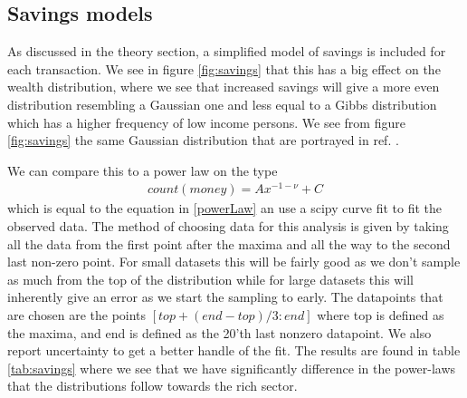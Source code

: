 \documentclass[a4paper,11pt]{article}
\begin{document}
{\subsection{Savings models}
As discussed in the theory section, a simplified model of savings is included for each transaction. We see in figure \ref{fig:savings} that this has a big effect on the wealth distribution, where we see that increased savings will give a more even distribution resembling a Gaussian one and less equal to a Gibbs distribution which has a higher frequency of low income persons. We see from figure \ref{fig:savings} the same Gaussian distribution that are portrayed in ref. \cite{GibbsVsnon-Gibbs}.




We can compare this to a power law on the type
\begin{align}
	count (money) = Ax^{-1-\nu} + C
\end{align}
which is equal to the equation in \ref{powerLaw} an use a scipy curve fit to fit the observed data. The method of choosing data for this analysis is given by taking all the data from the first point after the maxima and all the way to the second last non-zero point. For small datasets this will be fairly good as we don't sample as much from the top of the distribution while for large datasets this will inherently give an error as we start the sampling to early. The datapoints that are chosen are the points $[top + (end-top)/3 : end]$ where top is defined as the maxima, and end is defined as the 20'th last nonzero datapoint. We also report uncertainty to get a better handle of the fit. The results are found in table \ref{tab:savings} where we see that we have significantly difference in the power-laws that the distributions follow towards the rich sector. 


}
\end{document}
